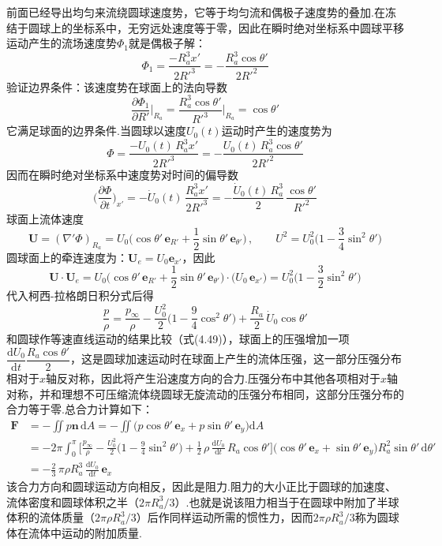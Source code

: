 前面已经导出均匀来流绕圆球速度势，它等于均匀流和偶极子速度势的叠加.在冻结于圆球上的坐标系中，无穷远处速度等于零，因此在瞬时绝对坐标系中圆球平移运动产生的流场速度势$\Phi_1$就是偶极子解：
\[
\Phi_1=\frac{-R_a^{3}x'}{2R'^{3}}=-\frac{R_a^{3}\cos\theta'}{2R'^{2}}
\]
验证边界条件：该速度势在球面上的法向导数
\[
\frac{\partial\Phi_1}{\partial R'}\bigg|_{R_a}=\frac{R_a^{3}\cos\theta'}{R'^{3}}\bigg|_{R_a}=\cos\theta'
\]
它满足球面的边界条件.当圆球以速度$U_0(t)$运动时产生的速度势为
\[
\Phi=\frac{-U_0(t)\,R_a^{3}x'}{2R'^{3}}=-\frac{U_0(t)\,R_a^{3}\cos\theta'}{2R'^{2}}
\]
因而在瞬时绝对坐标系中速度势对时间的偏导数
\[
\Big(\frac{\partial\Phi}{\partial t}\Big)_{x'}=-\dot{U}_0(t)\,\frac{R_a^{3}x'}{2R'^{3}}=-\frac{\dot{U}_0(t)\,R_a^{3}}{2}\,\frac{\cos\theta'}{R'^{2}}
\]
球面上流体速度
\[
\boldsymbol{U}=(\nabla'\Phi)_{R_a}=U_0\Big(\cos\theta'\,\boldsymbol{e}_{R'}+\frac{1}{2}\sin\theta'\,\boldsymbol{e}_{\theta'}\Big)\,,\qquad U^{2}=U_0^{2}\Big(1-\frac{3}{4}\sin^{2}\theta'\Big)
\]
圆球面上的牵连速度为：$\boldsymbol{U}_e=U_0\boldsymbol{e}_{x'}$，因此
\[
\boldsymbol{U}\cdot\boldsymbol{U}_e=U_0\Big(\cos\theta'\,\boldsymbol{e}_{R'}+\frac{1}{2}\sin\theta'\,\boldsymbol{e}_{\theta'}\Big)\cdot\big(U_0\,\boldsymbol{e}_{x'}\big)=U_0^{2}\Big(1-\frac{3}{2}\sin^{2}\theta'\Big)
\]
代入柯西-拉格朗日积分式后得
\[
\frac{p}{\rho}=\frac{p_\infty}{\rho}-\frac{U_0^{2}}{2}\Big(1-\frac{9}{4}\cos^{2}\theta'\Big)+\frac{R_a}{2}\,\dot{U}_0\cos\theta'
\]
和圆球作等速直线运动的结果比较（式(4.49)），球面上的压强增加一项$\dfrac{\mathrm{d}U_0}{\mathrm{d}t}\dfrac{R_a\cos\theta'}{2}$，这是圆球加速运动时在球面上产生的流体压强，这一部分压强分布相对于$x$轴反对称，因此将产生沿速度方向的合力.压强分布中其他各项相对于$x$轴对称，并和理想不可压缩流体绕圆球无旋流动的压强分布相同，这部分压强分布的合力等于零.总合力计算如下：
\begin{align*}
\boldsymbol{F}&=-\iint p\boldsymbol{n}\,\mathrm{d}A=-\iint\big(p\cos\theta'\,\boldsymbol{e}_x+p\sin\theta'\,\boldsymbol{e}_y\big)\mathrm{d}A\\
&=-2\pi\int_0^{\pi}\bigg[\frac{p_\infty}{\rho}-\frac{U_0^{2}}{2}\Big(1-\frac{9}{4}\sin^{2}\theta'\Big)+\frac{1}{2}\,\rho\,\frac{\mathrm{d}U_0}{\mathrm{d}t}\,R_a\cos\theta'\bigg]\big(\cos\theta'\,\boldsymbol{e}_x+\sin\theta'\,\boldsymbol{e}_y\big)R_a^{2}\sin\theta'\,\mathrm{d}\theta'\\
&=-\frac{2}{3}\,\pi\rho R_a^{3}\,\frac{\mathrm{d}U_0}{\mathrm{d}t}\,\boldsymbol{e}_x
\end{align*}
该合力方向和圆球运动方向相反，因此是阻力.阻力的大小正比于圆球的加速度、流体密度和圆球体积之半（$2\pi R_a^{3}/3$）.也就是说该阻力相当于在圆球中附加了半球体积的流体质量（$2\pi\rho R_a^{3}/3$）后作同样运动所需的惯性力，因而$2\pi\rho R_a^{3}/3$称为圆球体在流体中运动的附加质量.

